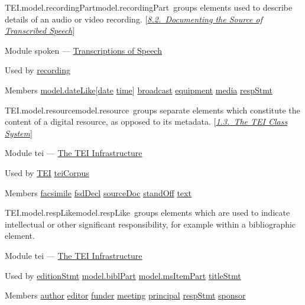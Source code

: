 \begin{reflist}
\item[]\begin{specHead}{TEI.model.recordingPart}{model.recordingPart} groups elements used to describe details of an audio or video recording. [\textit{\hyperref[HD32]{8.2.\ Documenting the Source of Transcribed Speech}}]\end{specHead} 
    \item[{Module}]
  spoken — \hyperref[TS]{Transcriptions of Speech}
    \item[{Used by}]
  \hyperref[TEI.recording]{recording}
    \item[{Members}]
  \hyperref[TEI.model.dateLike]{model.dateLike}[\hyperref[TEI.date]{date} \hyperref[TEI.time]{time}] \hyperref[TEI.broadcast]{broadcast} \hyperref[TEI.equipment]{equipment} \hyperref[TEI.media]{media} \hyperref[TEI.respStmt]{respStmt}
\end{reflist}  
\begin{reflist}
\item[]\begin{specHead}{TEI.model.resource}{model.resource} groups separate elements which constitute the content of a digital resource, as opposed to its metadata. [\textit{\hyperref[STEC]{1.3.\ The TEI Class System}}]\end{specHead} 
    \item[{Module}]
  tei — \hyperref[ST]{The TEI Infrastructure}
    \item[{Used by}]
  \hyperref[TEI.TEI]{TEI} \hyperref[TEI.teiCorpus]{teiCorpus}
    \item[{Members}]
  \hyperref[TEI.facsimile]{facsimile} \hyperref[TEI.fsdDecl]{fsdDecl} \hyperref[TEI.sourceDoc]{sourceDoc} \hyperref[TEI.standOff]{standOff} \hyperref[TEI.text]{text}
\end{reflist}  
\begin{reflist}
\item[]\begin{specHead}{TEI.model.respLike}{model.respLike} groups elements which are used to indicate intellectual or other significant responsibility, for example within a bibliographic element.\end{specHead} 
    \item[{Module}]
  tei — \hyperref[ST]{The TEI Infrastructure}
    \item[{Used by}]
  \hyperref[TEI.editionStmt]{editionStmt} \hyperref[TEI.model.biblPart]{model.biblPart} \hyperref[TEI.model.msItemPart]{model.msItemPart} \hyperref[TEI.titleStmt]{titleStmt}
    \item[{Members}]
  \hyperref[TEI.author]{author} \hyperref[TEI.editor]{editor} \hyperref[TEI.funder]{funder} \hyperref[TEI.meeting]{meeting} \hyperref[TEI.principal]{principal} \hyperref[TEI.respStmt]{respStmt} \hyperref[TEI.sponsor]{sponsor}
\end{reflist}  
